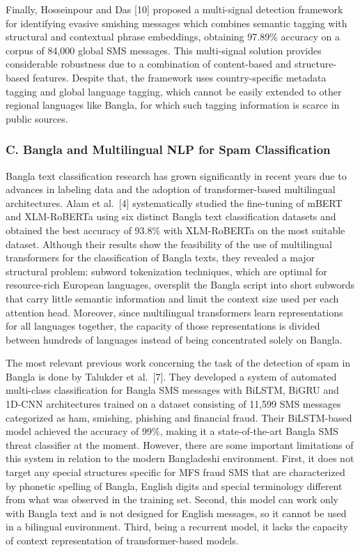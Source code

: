 Finally, Hosseinpour and Das {[}10{]} proposed a multi-signal detection
framework for identifying evasive smishing messages which combines
semantic tagging with structural and contextual phrase embeddings,
obtaining 97.89\% accuracy on a corpus of 84,000 global SMS messages.
This multi-signal solution provides considerable robustness due to a
combination of content-based and structure-based features. Despite that,
the framework uses country-specific metadata tagging and global language
tagging, which cannot be easily extended to other regional languages
like Bangla, for which such tagging information is scarce in public
sources.

\subsubsection{C. Bangla and Multilingual NLP for Spam
Classification}\label{c.-bangla-and-multilingual-nlp-for-spam-classification}

Bangla text classification research has grown significantly in recent
years due to advances in labeling data and the adoption of
transformer-based multilingual architectures. Alam et al.~{[}4{]}
systematically studied the fine-tuning of mBERT and XLM-RoBERTa using
six distinct Bangla text classification datasets and obtained the best
accuracy of 93.8\% with XLM-RoBERTa on the most suitable dataset.
Although their results show the feasibility of the use of multilingual
transformers for the classification of Bangla texts, they revealed a
major structural problem: subword tokenization techniques, which are
optimal for resource-rich European languages, oversplit the Bangla
script into short subwords that carry little semantic information and
limit the context size used per each attention head. Moreover, since
multilingual transformers learn representations for all languages
together, the capacity of those representations is divided between
hundreds of languages instead of being concentrated solely on Bangla.

The most relevant previous work concerning the task of the detection of
spam in Bangla is done by Talukder et al.~{[}7{]}. They developed a
system of automated multi-class classification for Bangla SMS messages
with BiLSTM, BiGRU and 1D-CNN architectures trained on a dataset
consisting of 11,599 SMS messages categorized as ham, smishing, phishing
and financial fraud. Their BiLSTM-based model achieved the accuracy of
99\%, making it a state-of-the-art Bangla SMS threat classifier at the
moment. However, there are some important limitations of this system in
relation to the modern Bangladeshi environment. First, it does not
target any special structures specific for MFS fraud SMS that are
characterized by phonetic spelling of Bangla, English digits and special
terminology different from what was observed in the training set.
Second, this model can work only with Bangla text and is not designed
for English messages, so it cannot be used in a bilingual environment.
Third, being a recurrent model, it lacks the capacity of context
representation of transformer-based models.

